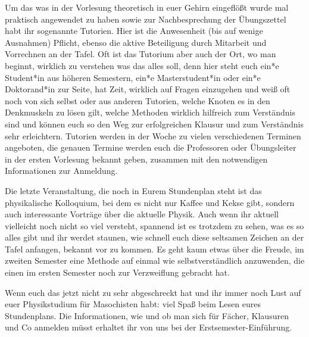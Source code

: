 Um das was in der Vorlesung theoretisch in euer Gehirn eingeflößt wurde mal praktisch angewendet zu haben sowie zur Nachbesprechung der Übungszettel habt ihr sogenannte Tutorien. Hier ist die Anwesenheit (bis auf wenige Ausnahmen) Pflicht, ebenso die aktive Beteiligung durch Mitarbeit und Vorrechnen an der Tafel. Oft ist das Tutorium aber auch der Ort, wo man beginnt, wirklich zu verstehen was das alles soll, denn hier steht euch ein*e Student*in aus höheren Semestern, ein*e Masterstudent*in oder ein*e Doktorand*in zur Seite, hat Zeit, wirklich auf Fragen einzugehen und weiß oft noch von sich selbst oder aus anderen Tutorien, welche Knoten es in den Denkmuskeln zu lösen gilt, welche Methoden wirklich hilfreich zum Verständnis sind und können euch so den Weg zur erfolgreichen Klausur und zum Verständnis sehr erleichtern. Tutorien werden in der Woche zu vielen verschiedenen Terminen angeboten, die genauen Termine werden euch die Professoren oder Übungsleiter in der ersten Vorlesung bekannt geben, zusammen mit den notwendigen Informationen zur Anmeldung.

Die letzte Veranstaltung, die noch in Eurem Stundenplan steht ist das physikalische Kolloquium, bei dem es nicht nur Kaffee und Kekse gibt, sondern auch interessante Vorträge über die aktuelle Physik. Auch wenn ihr aktuell vielleicht noch nicht so viel versteht, spannend ist es trotzdem zu sehen, was es so alles gibt und ihr werdet staunen, wie schnell euch diese seltsamen Zeichen an der Tafel anfangen, bekannt vor zu kommen. Es geht kaum etwas über die Freude, im zweiten Semester eine Methode auf einmal wie selbstverständlich anzuwenden, die einen im ersten Semester noch zur Verzweiflung gebracht hat. 

Wenn euch das jetzt nicht zu sehr abgeschreckt hat und ihr immer noch Lust auf euer Physikstudium für Masochisten habt: viel Spaß beim Lesen eures Stundenplans. Die Informationen, wie und ob man sich für Fächer, Klausuren und Co anmelden müsst erhaltet ihr von uns bei der Erstsemester-Einführung.

\newcommand{\rb}{\raisebox{-1.5ex}[-1.5ex]}

\noindent%
\

